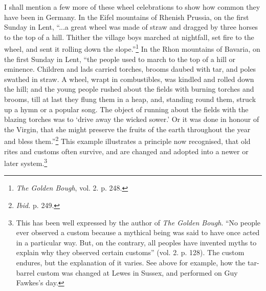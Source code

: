 \documentclass[a4paper, 11pt, oneside, polutonikogreek, english]{article}
\begin{document}
I shall mention a few more of these wheel celebrations to show how common they have been in Germany. In the Eifel mountains of Rhenish Prussia, on the first Sunday in Lent, ``...a great wheel was made of straw and dragged by three horses to the top of a hill. Thither the village boys marched at nightfall, set fire to the wheel, and sent it rolling down the slope.''\footnote{\emph{The Golden Bough}, vol. 2. p. 248.} In the Rhon mountains of Bavaria, on the first Sunday in Lent, ``the people used to march to the top of a hill or eminence. Children and lads carried torches, brooms daubed with tar, and poles swathed in straw. A wheel, wrapt in combustibles, was kindled and rolled down the hill; and the young people rushed about the fields with burning torches and brooms, till at last they flung them in a heap, and, standing round them, struck up a hymn or a popular song. The object of running about the fields with the blazing torches was to `drive away the wicked sower.' Or it was done in honour of the Virgin, that she might preserve the fruits of the earth throughout the year and bless them.''\footnote{\emph{Ibid.} p. 249.} This example illustrates a principle now recognised, that old rites and customs often survive, and are changed and adopted into a newer or later system.\footnote{This has been well expressed by the author of \emph{The Golden Bough}. ``No people ever observed a custom because a mythical being was said to have once acted in a particular way. But, on the contrary, all peoples have invented myths to explain why they observed certain customs'' (vol. 2. p. 128). The custom endures, but the explanation of it varies. See above for example, how the tar-barrel custom was changed at Lewes in Sussex, and performed on Guy Fawkes's day.}
\end{document}
